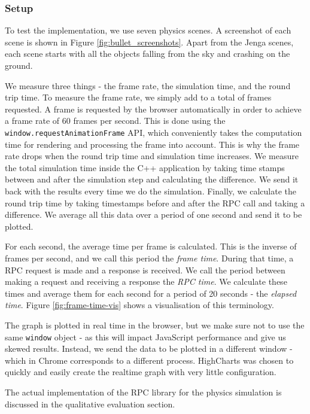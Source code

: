 \subsubsection{Setup} %
\label{ssub:bullet_performance_setup}
To test the implementation, we use seven physics scenes. A screenshot of each scene is shown in Figure \ref{fig:bullet_screenshots}. Apart from the Jenga scenes, each scene starts with all the objects falling from the sky and crashing on the ground.

We measure three things - the frame rate, the simulation time, and the round trip time. To measure the frame rate, we simply add to a total of frames requested. A frame is requested by the browser automatically in order to achieve a frame rate of 60 frames per second. This is done using the \lstinline{window.requestAnimationFrame} API, which conveniently takes the computation time for rendering and processing the frame into account. This is why the frame rate drops when the round trip time and simulation time increases. We measure the total simulation time inside the C++ application by taking time stamps between and after the simulation step and calculating the difference. We send it back with the results every time we do the simulation. Finally, we calculate the round trip time by taking timestamps before and after the RPC call and taking a difference. We average all this data over a period of one second and send it to be plotted.

For each second, the average time per frame is calculated. This is the inverse of frames per second, and we call this period the \emph{frame time}. During that time, a RPC request is made and a response is received. We call the period between making a request and receiving a response the \emph{RPC time}. We calculate these times and average them for each second for a period of 20 seconds - the \emph{elapsed time}. Figure \ref{fig:frame-time-vis} shows a visualisation of this terminology.

The graph is plotted in real time in the browser, but we make sure not to use the same \lstinline{window} object - as this will impact JavaScript performance and give us skewed results. Instead, we send the data to be plotted in a different window - which in Chrome corresponds to a different process. HighCharts was chosen to quickly and easily create the realtime graph with very little configuration.

The actual implementation of the RPC library for the physics simulation is discussed in the qualitative evaluation section.

